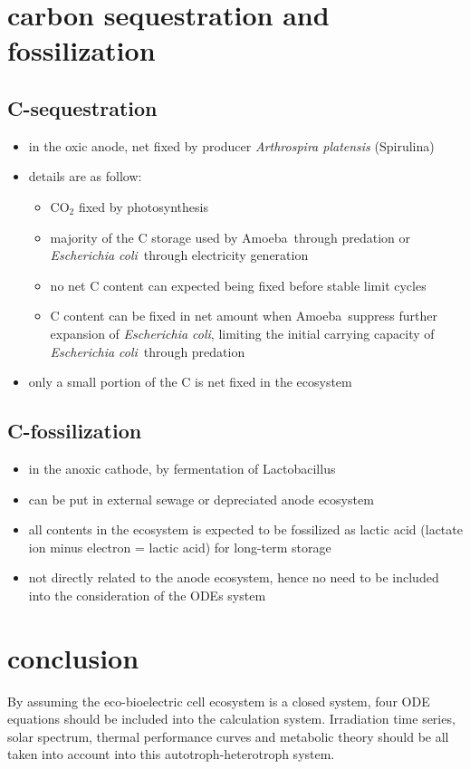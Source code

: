\documentclass[a4paper,11pt]{article}
\newcommand{\ec}{\textit{Escherichia coli}}
\newcommand{\am}{Amoeba}
\newcommand{\ap}{\textit{Arthrospira platensis} (Spirulina)}
\begin{document}
    \section{carbon sequestration and fossilization}
    \subsection{C-sequestration}
    \begin{itemize}
        \item in the oxic anode, net fixed by producer \ap
        \item details are as follow:
        \begin{itemize}
            \item CO$_2$ fixed by photosynthesis
            \item majority of the C storage used by \am\ through predation or \ec\ through electricity generation
            \item no net C content can expected being fixed before stable limit cycles
            \item C content can be fixed in net amount when \am\ suppress further expansion of \ec, limiting the initial carrying capacity of \ec\ through predation
        \end{itemize}
        \item only a small portion of the C is net fixed in the ecosystem
    \end{itemize}

    \subsection{C-fossilization}
    \begin{itemize}
        \item in the anoxic cathode, by fermentation of Lactobacillus
        \item can be put in external sewage or depreciated anode ecosystem
        \item all contents in the ecosystem is expected to be fossilized as lactic acid (lactate ion minus electron = lactic acid) for long-term storage
        \item not directly related to the anode ecosystem, hence no need to be included into the consideration of the ODEs system
    \end{itemize}
    
    \section{conclusion}
    By assuming the eco-bioelectric cell ecosystem is a closed system, four ODE equations should be included into the calculation system.  Irradiation time series, solar spectrum, thermal performance curves and metabolic theory should be all taken into account into this autotroph-heterotroph system.

    \nocite{*}\printbibliography
\end{document}
